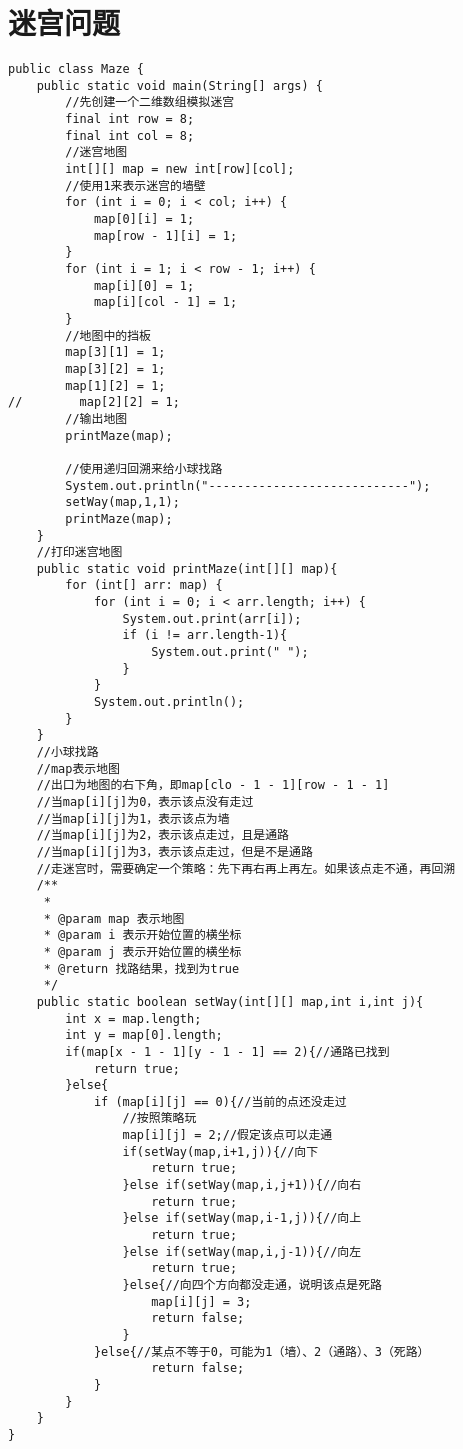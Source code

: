 \documentclass[a4paper]{report}
\begin{document}
\section{迷宫问题}
\begin{lstlisting}
public class Maze {
    public static void main(String[] args) {
        //先创建一个二维数组模拟迷宫
        final int row = 8;
        final int col = 8;
        //迷宫地图
        int[][] map = new int[row][col];
        //使用1来表示迷宫的墙壁
        for (int i = 0; i < col; i++) {
            map[0][i] = 1;
            map[row - 1][i] = 1;
        }
        for (int i = 1; i < row - 1; i++) {
            map[i][0] = 1;
            map[i][col - 1] = 1;
        }
        //地图中的挡板
        map[3][1] = 1;
        map[3][2] = 1;
        map[1][2] = 1;
//        map[2][2] = 1;
        //输出地图
        printMaze(map);

        //使用递归回溯来给小球找路
        System.out.println("----------------------------");
        setWay(map,1,1);
        printMaze(map);
    }
    //打印迷宫地图
    public static void printMaze(int[][] map){
        for (int[] arr: map) {
            for (int i = 0; i < arr.length; i++) {
                System.out.print(arr[i]);
                if (i != arr.length-1){
                    System.out.print(" ");
                }
            }
            System.out.println();
        }
    }
    //小球找路
    //map表示地图
    //出口为地图的右下角，即map[clo - 1 - 1][row - 1 - 1]
    //当map[i][j]为0，表示该点没有走过
    //当map[i][j]为1，表示该点为墙
    //当map[i][j]为2，表示该点走过，且是通路
    //当map[i][j]为3，表示该点走过，但是不是通路
    //走迷宫时，需要确定一个策略：先下再右再上再左。如果该点走不通，再回溯
    /**
     *
     * @param map 表示地图
     * @param i 表示开始位置的横坐标
     * @param j 表示开始位置的横坐标
     * @return 找路结果，找到为true
     */
    public static boolean setWay(int[][] map,int i,int j){
        int x = map.length;
        int y = map[0].length;
        if(map[x - 1 - 1][y - 1 - 1] == 2){//通路已找到
            return true;
        }else{
            if (map[i][j] == 0){//当前的点还没走过
                //按照策略玩
                map[i][j] = 2;//假定该点可以走通
                if(setWay(map,i+1,j)){//向下
                    return true;
                }else if(setWay(map,i,j+1)){//向右
                    return true;
                }else if(setWay(map,i-1,j)){//向上
                    return true;
                }else if(setWay(map,i,j-1)){//向左
                    return true;
                }else{//向四个方向都没走通，说明该点是死路
                    map[i][j] = 3;
                    return false;
                }
            }else{//某点不等于0，可能为1（墙）、2（通路）、3（死路）
                    return false;
            }
        }
    }
}
\end{lstlisting}
\end{document}
